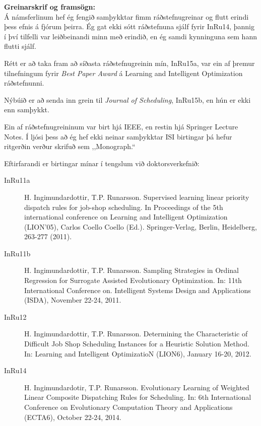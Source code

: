 \documentclass{cover}
\newcommand{\mycaption}[1]{{\bfseries #1:}\\}
\begin{document}
{\mycaption{Greinarskrif og framsögn}
Á námsferlinum hef ég fengið samþykktar fimm ráðstefnugreinar og flutt erindi 
þess efnis á fjórum þeirra. Ég gat ekki sótt ráðstefnuna sjálf fyrir InRu14, 
þannig í því tilfelli var leiðbeinandi minn með erindið, en ég samdi kynninguna 
sem hann flutti sjálf.

Rétt er að taka fram að síðasta ráðstefnugreinin mín, InRu15a, var ein af 
þremur tilnefningum fyrir \emph{Best Paper Award} á Learning and Intelligent 
Optimization ráðstefnunni. 

Nýbúið er að senda inn grein til \emph{Journal of Scheduling}, InRu15b, 
en hún er ekki enn samþykkt. 

Ein af ráðstefnugreininum var birt hjá IEEE, en restin hjá Springer Lecture 
Notes. 
Í ljósi þess að ég hef ekki neinar samþykktar ISI birtingar þá hefur ritgerðin 
verður skrifuð sem ,,Monograph.``

Eftirfarandi er birtingar mínar í tengslum við doktorsverkefnið:
\begin{description}
    \item[InRu11a] H. Ingimundardottir, T.P. Runarsson. Supervised learning 
    linear priority dispatch rules for job-shop scheduling. In Proceedings of 
    the 5th international conference on Learning and Intelligent Optimization 
    (LION'05), Carlos Coello Coello (Ed.). Springer-Verlag, Berlin, Heidelberg, 
    263-277 (2011). %

    \item[InRu11b] H. Ingimundardottir, T.P. Runarsson. Sampling Strategies in 
    Ordinal Regression for Surrogate Assisted Evolutionary Optimization. In: 
    11th International Conference on. Intelligent Systems Design and 
    Applications (ISDA), November 22-24, 2011. %

    \item[InRu12] H. Ingimundardottir, T.P. Runarsson. Determining the 
    Characteristic of Difficult Job Shop Scheduling Instances for a Heuristic 
    Solution Method. In: Learning and Intelligent OptimizatioN (LION6), January 
    16-20, 2012. %
       
    \item[InRu14] H. Ingimundardotir, T.P. Runarsson. Evolutionary Learning of 
    Weighted Linear Composite Dispatching Rules for Scheduling. In: 6th 
    International Conference on Evolutionary Computation Theory and 
    Applications (ECTA6), October 22-24, 2014. %
    

\end{description}}
\end{document}
